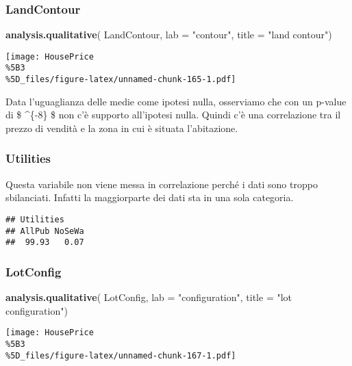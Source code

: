 \documentclass[
]{article}
\newenvironment{Shaded}{\begin{snugshade}}{\end{snugshade}}
\newcommand{\AttributeTok}[1]{\textcolor[rgb]{0.13,0.29,0.53}{#1}}
\newcommand{\FunctionTok}[1]{\textcolor[rgb]{0.13,0.29,0.53}{\textbf{#1}}}
\newcommand{\NormalTok}[1]{#1}
\newcommand{\StringTok}[1]{\textcolor[rgb]{0.31,0.60,0.02}{#1}}
\begin{document}
\subsubsection{LandContour}\label{landcontour-1}

\begin{Shaded}
\begin{Highlighting}[]
\FunctionTok{analysis.qualitative}\NormalTok{(}
\NormalTok{    LandContour,}
    \AttributeTok{lab =} \StringTok{"contour"}\NormalTok{,}
    \AttributeTok{title =} \StringTok{"land contour"}\NormalTok{)}
\end{Highlighting}
\end{Shaded}

\texttt{[image: HousePrice\\\%5B3\\\%5D\_files/figure-latex/unnamed-chunk-165-1.pdf]}

Data l'uguaglianza delle medie come ipotesi nulla, osserviamo che con un
p-value di \$ \^{}\{-8\} \$ non c'è supporto all'ipotesi
nulla. Quindi c'è una correlazione tra il prezzo di vendità e la zona in
cui è situata l'abitazione.

\subsubsection{Utilities}\label{utilities-1}

Questa variabile non viene messa in correlazione perché i dati sono
troppo sbilanciati. Infatti la maggiorparte dei dati sta in una sola
categoria.

\begin{verbatim}
## Utilities
## AllPub NoSeWa 
##  99.93   0.07
\end{verbatim}

\subsubsection{LotConfig}\label{lotconfig-1}

\begin{Shaded}
\begin{Highlighting}[]
\FunctionTok{analysis.qualitative}\NormalTok{(}
\NormalTok{    LotConfig,}
    \AttributeTok{lab =} \StringTok{"configuration"}\NormalTok{,}
    \AttributeTok{title =} \StringTok{"lot configuration"}\NormalTok{)}
\end{Highlighting}
\end{Shaded}

\texttt{[image: HousePrice\\\%5B3\\\%5D\_files/figure-latex/unnamed-chunk-167-1.pdf]}
\end{document}
